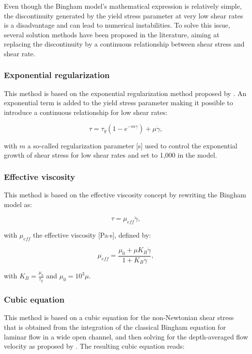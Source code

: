 Even though the Bingham model’s mathematical expression is relatively simple,
the discontinuity generated by the yield stress parameter at very low shear
rates is a disadvantage and can lead to numerical instabilities.
To solve this issue, several solution methods have been proposed in the
literature, aiming at replacing the discontinuity by a continuous relationship
between shear stress and shear rate.

\subsubsection{Exponential regularization}

This method is based on the exponential regularization method proposed by
\cite{papanastasiou1987flows}.
An exponential term is added to the yield stress parameter making it possible to
introduce a continuous relationship for low shear rates:

\begin{equation}
  \tau = \tau_y(1-e^{-m\dot{\gamma}})+\mu\dot{\gamma},
\end{equation}

with $m$ a so-called regularization parameter [s] used to control the exponential
growth of shear stress for low shear rates and set to 1,000 in the model.

\subsubsection{Effective viscosity}

This method is based on the effective viscosity concept by rewriting the Bingham
model as:

\begin{equation}
\tau= \mu_{eff}\dot{\gamma},
\end{equation}

with $\mu_{eff}$ the effective viscosity [Pa$\cdot$s], defined by:

\begin{equation}
\mu_{eff}=\frac{\mu_0+\mu K_B\dot{\gamma}}{1+K_B\dot{\gamma}},
\end{equation}

with $K_B=\frac{\mu_0}{\tau_y}$ and $\mu_0=10^3\mu$.

\subsubsection{Cubic equation}

This method is based on a cubic equation for the non-Newtonian shear stress that
is obtained from the integration of the classical Bingham equation for laminar
flow in a wide open channel, and then solving for the depth-averaged flow
velocity as proposed by \cite{rickenmann1990bedload}.
The resulting cubic equation reads:

